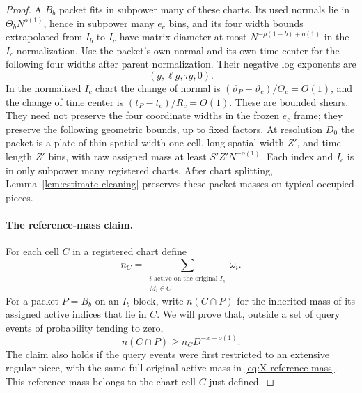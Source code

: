 \begin{proof}
A $B_b$ packet fits in subpower many of these charts. Its used
normals lie in $\Theta_bN^{o(1)}$, hence in subpower many $e_c$
bins, and its four width bounds extrapolated from $I_b$ to $I_c$
have matrix diameter at most $N^{-\rho(1-b)+o(1)}$ in the
$I_c$ normalization. Use the packet's own normal and its own time center for the following
four widths after parent normalization. Their negative log exponents
are
\begin{equation}
 (g,\ell g,\tau g,0).
\label{eq:X-normalized-packet-widths}
\end{equation}
In the normalized $I_c$ chart the change of normal is
$(\vartheta_P-\vartheta_c)/\Theta_c=O(1)$, and the change of time
center is $(t_P-t_c)/R_c=O(1)$. These are bounded shears. They need
not preserve the four coordinate widths in the frozen $e_c$ frame;
they preserve the following geometric bounds, up to fixed factors.
At resolution $D_0$ the packet is a plate of thin spatial width one
cell, long spatial width $Z'$, and time length $Z'$ bins, with raw
assigned mass at least $S'Z'N^{-o(1)}$.
Each index and $I_c$ is in only subpower many registered charts.
After chart splitting, Lemma~\ref{lem:estimate-cleaning} preserves
these packet masses on typical occupied pieces.

\paragraph{The reference-mass claim.}
For each cell $C$ in a registered chart define
\begin{equation}
 n_C=\sum_{\substack{i\text{ active on the original }I_c\\M_i\in C}}
                   \omega_i.
\label{eq:X-reference-mass}
\end{equation}
For a packet $P=B_b$ on an $I_b$ block, write $n(C\cap P)$ for
the inherited mass of its assigned active indices that lie in $C$.
We will prove that, outside a set of query events of probability
tending to zero,
\begin{equation}
 n(C\cap P)\ge n_C D^{-x-o(1)}.
\label{eq:X-reference-packet}
\end{equation}
The claim also holds if the query events were first restricted to an
extensive regular piece, with the same full original active mass in
\eqref{eq:X-reference-mass}. This reference mass belongs to the chart cell
$C$ just defined.


\end{proof}
